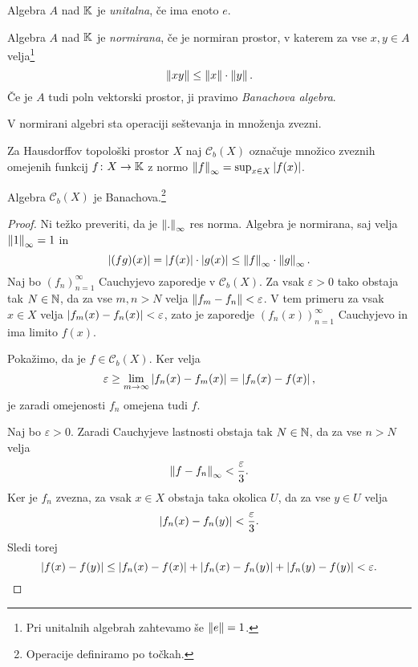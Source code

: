 \begin{definicija}
Algebra $A$ nad $\mathbb{K}$ je \emph{unitalna},
če ima enoto $e$.
\end{definicija}

\begin{definicija}
Algebra $A$ nad $\mathbb{K}$ je \emph{normirana},
če je normiran prostor, v katerem za vse $x,y \in A$
velja\footnote{Pri unitalnih algebrah zahtevamo še $\left\lVert e\right\rVert = 1$.}
\[
\left\lVert xy\right\rVert \leq \left\lVert x\right\rVert \cdot \left\lVert y\right\rVert.
\]
Če je $A$ tudi poln vektorski prostor, ji pravimo
\emph{Banachova algebra}.
\end{definicija}

\begin{opomba}
V normirani algebri sta operaciji seštevanja in množenja zvezni.
\end{opomba}

\begin{definicija}
Za Hausdorffov topološki prostor $X$ naj $\mathcal{C}_b(X)$
označuje množico zveznih omejenih funkcij $f \colon X \to \mathbb{K}$ z
normo $\left\lVert f\right\rVert_\infty = \sup_{x \in X} \left\lvert f(x)\right\rvert$.
\end{definicija}

\begin{trditev}
Algebra $\mathcal{C}_b(X)$ je Banachova.\footnote{Operacije
definiramo po točkah.}
\end{trditev}

\begin{proof}
Ni težko preveriti, da je $\left\lVert .\right\rVert_\infty$ res norma. Algebra je
normirana, saj velja $\left\lVert 1\right\rVert_\infty = 1$ in
\[
\left\lvert (fg)(x)\right\rvert = \left\lvert f(x)\right\rvert \cdot \left\lvert g(x)\right\rvert \leq
\left\lVert f\right\rVert_\infty \cdot \left\lVert g\right\rVert_\infty.
\]
Naj bo $(f_n)_{n=1}^\infty$ Cauchyjevo zaporedje v
$\mathcal{C}_b(X)$. Za vsak $\varepsilon > 0$ tako obstaja tak
$N \in \mathbb{N}$, da za vse $m, n > N$ velja
$\left\lVert f_m - f_n\right\rVert < \varepsilon$. V tem primeru za vsak $x \in X$
velja $\left\lvert f_m(x) - f_n(x)\right\rvert < \varepsilon$, zato je zaporedje
$(f_n(x))_{n=1}^\infty$ Cauchyjevo in ima limito $f(x)$.

Pokažimo, da je $f \in \mathcal{C}_b(X)$. Ker velja
\[
\varepsilon \geq \lim_{m \to \infty} \left\lvert f_n(x) - f_m(x)\right\rvert =
\left\lvert f_n(x) - f(x)\right\rvert,
\]
je zaradi omejenosti $f_n$ omejena tudi $f$.

Naj bo $\varepsilon > 0$. Zaradi Cauchyjeve lastnosti obstaja tak
$N \in \mathbb{N}$, da za vse $n > N$ velja
\[
\left\lVert f - f_n\right\rVert_\infty < \frac{\varepsilon}{3}.
\]
Ker je $f_n$ zvezna, za vsak $x \in X$ obstaja taka okolica $U$,
da za vse $y \in U$ velja
\[
\left\lvert f_n(x) - f_n(y)\right\rvert < \frac{\varepsilon}{3}.
\]
Sledi torej
\[
\left\lvert f(x) - f(y)\right\rvert \leq
\left\lvert f_n(x) - f(x)\right\rvert + \left\lvert f_n(x) - f_n(y)\right\rvert +\left\lvert f_n(y) - f(y)\right\rvert <
\varepsilon. \qedhere
\]
\end{proof}

